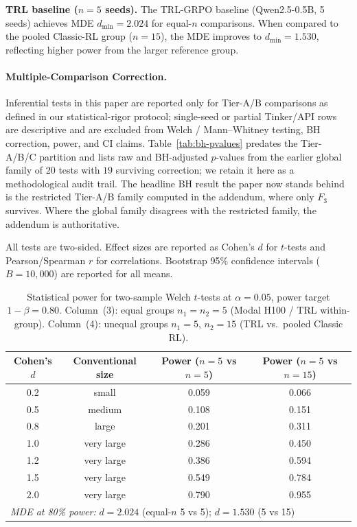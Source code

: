 \documentclass{article}
\begin{document}
\textbf{TRL baseline ($n = 5$ seeds).}
The TRL-GRPO baseline (Qwen2.5-0.5B, 5 seeds) achieves MDE
$d_{\min} = 2.024$ for equal-$n$ comparisons.
When compared to the pooled Classic-RL group ($n = 15$), the MDE
improves to $d_{\min} = 1.530$,
reflecting higher power from the larger reference group.

\paragraph{Multiple-Comparison Correction.}
Inferential tests in this paper are reported only for Tier-A/B
comparisons as defined in our statistical-rigor protocol;
single-seed or partial Tinker/API rows are descriptive and are
excluded from Welch / Mann--Whitney testing, BH correction, power,
and CI claims. Table~\ref{tab:bh-pvalues} predates the Tier-A/B/C
partition and lists raw and BH-adjusted $p$-values from the
earlier global family of $20$ tests with $19$ surviving correction;
we retain it here as a methodological audit trail. The headline
BH result the paper now stands behind is the restricted Tier-A/B
family computed in the addendum, where only $F_3$ survives. Where
the global family disagrees with the restricted family, the
addendum is authoritative.

All tests are two-sided.  Effect sizes are reported as Cohen's $d$ for
$t$-tests and Pearson/Spearman $r$ for correlations.  Bootstrap 95\%
confidence intervals ($B = 10{,}000$) are reported for all means.

\begin{table}[!ht]
\centering
\caption{Statistical power for two-sample Welch $t$-tests at $\alpha = 0.05$,
         power target $1{-}\beta = 0.80$.
         Column~(3): equal groups $n_1 = n_2 = 5$ (Modal H100 / TRL within-group).
         Column~(4): unequal groups $n_1 = 5$, $n_2 = 15$ (TRL vs.\ pooled Classic RL).}
\label{tab:power-analysis}
\small
\begin{tabular}{@{}cccc@{}}
\toprule
Cohen's $d$ & Conventional size & Power ($n{=}5$ vs $n{=}5$) & Power ($n{=}5$ vs $n{=}15$) \\
\midrule
        0.2 & small & 0.059 & 0.066 \\
        0.5 & medium & 0.108 & 0.151 \\
        0.8 & large & 0.201 & 0.311 \\
        1.0 & very large & 0.286 & 0.450 \\
        1.2 & very large & 0.386 & 0.594 \\
        1.5 & very large & 0.549 & 0.784 \\
        2.0 & very large & 0.790 & 0.955 \\
\midrule
\multicolumn{4}{l}{\textit{MDE at 80\% power:} $d = 2.024$ (equal-$n$ 5 vs 5);\; $d = 1.530$ (5 vs 15)} \\
\bottomrule
\end{tabular}
\end{table}
\end{document}
